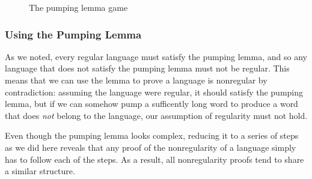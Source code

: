 \begin{figure}
\centering
{\footnotesize
\setlength{\fboxsep}{10pt}
\noindent{}
}
\caption{The pumping lemma game}
\label{fig:pumpinglemmagame}
\end{figure}

\subsubsection*{Using the Pumping Lemma}

As we noted, every regular language must satisfy the pumping lemma, and so any language that does not satisfy the pumping lemma must not be regular. This means that we can use the lemma to prove a language is nonregular by contradiction: assuming the language were regular, it should satisfy the pumping lemma, but if we can somehow pump a sufficently long word to produce a word that does \emph{not} belong to the language, our assumption of regularity must not hold.

Even though the pumping lemma looks complex, reducing it to a series of steps as we did here reveals that any proof of the nonregularity of a language simply has to follow each of the steps. As a result, all nonregularity proofs tend to share a similar structure.

